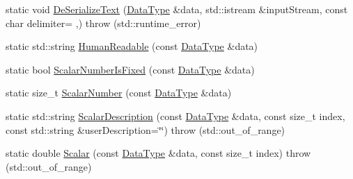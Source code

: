 \begin{DoxyCompactItemize}
\item 
static void \hyperlink{classcmn_data_3_01svl_filter_source_video_capture_types_1_1_external_trigger_01_4_a6347ae93a05d84e39f9ee7e67deabd0c}{De\+Serialize\+Text} (\hyperlink{classcmn_data_3_01svl_filter_source_video_capture_types_1_1_external_trigger_01_4_a40012c3eec7676d2b0252443ae621472}{Data\+Type} \&data, std\+::istream \&input\+Stream, const char delimiter= \textquotesingle{},\textquotesingle{})  throw (std\+::runtime\+\_\+error)
\item 
static std\+::string \hyperlink{classcmn_data_3_01svl_filter_source_video_capture_types_1_1_external_trigger_01_4_abb3b9b3b7588a82f92b125cf4c3911c7}{Human\+Readable} (const \hyperlink{classcmn_data_3_01svl_filter_source_video_capture_types_1_1_external_trigger_01_4_a40012c3eec7676d2b0252443ae621472}{Data\+Type} \&data)
\item 
static bool \hyperlink{classcmn_data_3_01svl_filter_source_video_capture_types_1_1_external_trigger_01_4_a718fa24163474f7fbe0a6e553de576a4}{Scalar\+Number\+Is\+Fixed} (const \hyperlink{classcmn_data_3_01svl_filter_source_video_capture_types_1_1_external_trigger_01_4_a40012c3eec7676d2b0252443ae621472}{Data\+Type} \&data)
\item 
static size\+\_\+t \hyperlink{classcmn_data_3_01svl_filter_source_video_capture_types_1_1_external_trigger_01_4_af8260b940cda631a114ba748926b5ab2}{Scalar\+Number} (const \hyperlink{classcmn_data_3_01svl_filter_source_video_capture_types_1_1_external_trigger_01_4_a40012c3eec7676d2b0252443ae621472}{Data\+Type} \&data)
\item 
static std\+::string \hyperlink{classcmn_data_3_01svl_filter_source_video_capture_types_1_1_external_trigger_01_4_a8d892fc63e0e0cef4f41c186595b3d84}{Scalar\+Description} (const \hyperlink{classcmn_data_3_01svl_filter_source_video_capture_types_1_1_external_trigger_01_4_a40012c3eec7676d2b0252443ae621472}{Data\+Type} \&data, const size\+\_\+t index, const std\+::string \&user\+Description=\char`\"{}\char`\"{})  throw (std\+::out\+\_\+of\+\_\+range)
\item 
static double \hyperlink{classcmn_data_3_01svl_filter_source_video_capture_types_1_1_external_trigger_01_4_a0f9cc3581e503cee8a9c10bdcd3dd784}{Scalar} (const \hyperlink{classcmn_data_3_01svl_filter_source_video_capture_types_1_1_external_trigger_01_4_a40012c3eec7676d2b0252443ae621472}{Data\+Type} \&data, const size\+\_\+t index)  throw (std\+::out\+\_\+of\+\_\+range)
\end{DoxyCompactItemize}


